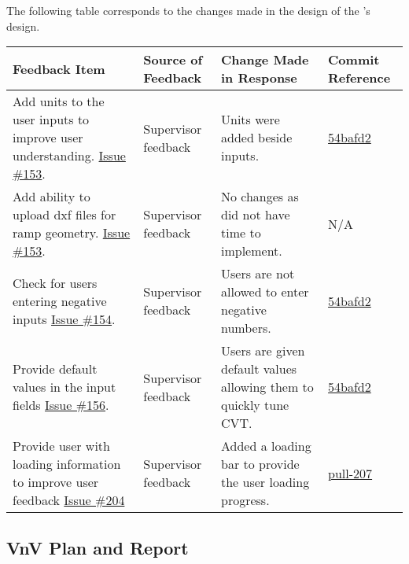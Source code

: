\documentclass{article}
\begin{document}
\noindent The following table corresponds to the changes made in the design of the \progname's  design.
\begin{longtable}{|p{4cm}|p{1.5cm}|p{4cm}|p{1.5cm}|}
    \hline
    \textbf{Feedback Item} & \textbf{Source of Feedback} & \textbf{Change Made in Response} & \textbf{Commit Reference} \\
    \hline
    \endfirsthead
    \hline
    \endhead
    \hline
    \endfoot
    \hline
    \endlastfoot
    Add units to the user inputs to improve user understanding. \href{https://github.com/gr812b/CVT-Simulator/issues/153}{Issue \#153}. & Supervisor feedback & Units were added beside inputs. & 
    \href{https://github.com/gr812b/CVT-Simulator/commit/54bafd2bf352567aea47488b067127ec2b9f7a34}{54bafd2} \\ 
    \hline 
    Add ability to upload dxf files for ramp geometry. \href{https://github.com/gr812b/CVT-Simulator/issues/157}{Issue \#153}. & Supervisor feedback & No changes as did not have time to implement. & 
    N/A \\ 
    \hline
    Check for users entering negative inputs  \href{https://github.com/gr812b/CVT-Simulator/issues/154}{Issue \#154}. & Supervisor feedback & Users are not allowed to enter negative numbers. & 
    \href{https://github.com/gr812b/CVT-Simulator/commit/54bafd2bf352567aea47488b067127ec2b9f7a34}{54bafd2} \\ 
    \hline 
    Provide default values in the input fields \href{https://github.com/gr812b/CVT-Simulator/issues/156}{Issue \#156}. & Supervisor feedback & Users are given default values allowing them to quickly tune CVT. & 
    \href{https://github.com/gr812b/CVT-Simulator/commit/54bafd2bf352567aea47488b067127ec2b9f7a34}{54bafd2} \\ 
    \hline 
    Provide user with loading information to improve user feedback \href{https://github.com/gr812b/CVT-Simulator/issues/204}{Issue \#204} & Supervisor feedback & Added a loading bar to provide the user loading progress. & 
    \href{https://github.com/gr812b/CVT-Simulator/pull/207}{pull-207} \\ 

\end{longtable}

\subsection{VnV Plan and Report}
\end{document}
